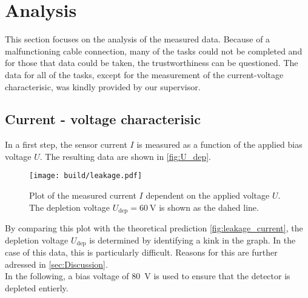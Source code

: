 \section{Analysis}
\label{sec:Analysis}
This section focuses on the analysis of the measured data. Because of a malfunctioning cable connection, many of the tasks could not be completed and for those
that data could be taken, the trustworthiness can be questioned. The data for all of the tasks, except for the measurement of the current-voltage characterisic,
was kindly provided by our supervisor.

\subsection{Current - voltage characterisic}
\label{sec:current-voltage characterisic}
In a first step, the sensor current $I$ is measured as a function of the applied bias voltage $U$. The resulting data are shown in \autoref{fig:U_dep}.
\begin{figure}
    \centering
    \texttt{[image: build/leakage.pdf]}
    \caption{Plot of the measured current $I$ dependent on the applied voltage $U$. The depletion voltage $U_{\mathrm{dep}} = \qty{60}{\volt}$ is shown as
    the dahed line.}
    \label{fig:U_dep}
\end{figure}
By comparing this plot with the theoretical prediction \autoref{fig:leakage_current}, the depletion voltage $U_{\mathrm{dep}}$ is determined by identifying a kink
in the graph. In the case of this data, this is particularly difficult. Reasons for this are further adressed in \autoref{sec:Discussion}. \\
In the following, a bias voltage of \qty{80}{\volt} is used to ensure that the detector is depleted entierly.

